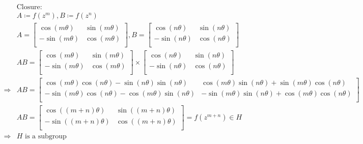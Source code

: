 \documentclass{article}
\begin{document}
\begin{equation*}
    \begin{split}
        &\text{Closure}:\\
        &A\coloneqq f(z^m),B\coloneqq f(z^n)\\
        &A=\begin{bmatrix}
            \cos(m\theta)&\sin(m\theta)\\
            -\sin(m\theta)&\cos(m\theta)\\
        \end{bmatrix},B=\begin{bmatrix}
            \cos(n\theta)&\sin(n\theta)\\
            -\sin(n\theta)&\cos(n\theta)\\
        \end{bmatrix}\\
        &AB=\begin{bmatrix}
            \cos(m\theta)&\sin(m\theta)\\
            -\sin(m\theta)&\cos(m\theta)\\
        \end{bmatrix}\times \begin{bmatrix}
            \cos(n\theta)&\sin(n\theta)\\
            -\sin(n\theta)&\cos(n\theta)\\
        \end{bmatrix}\\
        \Rightarrow&AB=\begin{bmatrix}
            \cos(m\theta)\cos(n\theta)-\sin(n\theta)\sin(n\theta)&\cos(m\theta)\sin(n\theta)+\sin(m\theta)\cos(n\theta)\\
            -\sin(m\theta)\cos(n\theta)-\cos(m\theta)\sin(n\theta)&-\sin(m\theta)\sin(n\theta)+\cos(m\theta)\cos(n\theta)\\
        \end{bmatrix}\\
        &AB=\begin{bmatrix}
            \cos((m+n)\theta)&\sin((m+n)\theta)\\
            -\sin((m+n)\theta)&\cos((m+n)\theta)\\
        \end{bmatrix}=f(z^{m+n})\in H\\
        \Rightarrow&H\text{ is a subgroup}\\
    \end{split}
\end{equation*}
\end{document}
